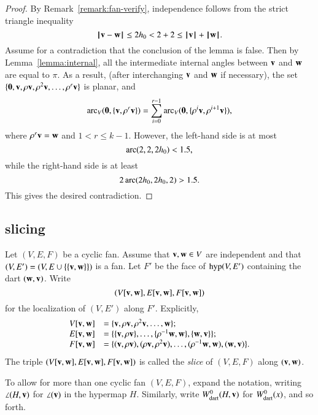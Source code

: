 \begin{proof} By Remark~\ref{remark:fan-verify}, independence follows from the strict triangle inequality
$$
\norm{\v}{\w} \le 2\hm < 2 + 2 \le \normo{\v} + \normo{\w}.
$$
Assume for a contradiction that the conclusion of the lemma is false.  Then by Lemma~\ref{lemma:internal}, all the intermediate internal angles between $\v$ and $\w$ are equal to $\pi$.  As a result, (after interchanging $\v$ and $\w$ if necessary), the set $\{\orz,\v,\rho\v,\rho^2\v,\ldots,\rho^r\v\}$ is planar, and
$$
\arc_V(\orz,\{\v,\rho^r\v\}) = \sum_{i=0}^{r-1} \arc_V(\orz,\{\rho^i\v,\rho^{i+1}\v\}),
$$
where $\rho^r \v = \w$ and $1 < r \le k-1$.
However, the left-hand side is at most
$$
\arc(2,2,2\hm) < 1.5,
$$
while the right-hand side is at least
$$
2\arc(2\hm,2\hm,2) > 1.5.
$$
This gives the desired contradiction.
\end{proof}

\subsection{slicing}

\begin{definition}[slice] Let $(V,E,F)$ be a cyclic fan.  Assume that $\v,\w\in V$ are
independent  and that
$(V,E')=(V,E\cup \{\{\v,\w\}\})$ is a fan.  Let $F'$ be the face of $\op{hyp}(V,E')$ 
containing the dart $(\w,\v)$.  Write
$$(V[\v,\w],E[\v,\w],F[\v,\w])$$
for the localization of $(V,E')$ along $F'$.  Explicitly,
$$
\begin{array}{lll}
V[\v,\w] &= \{\v,\rho \v,\rho^2 \v,\ldots,\w\};\\
E[\v,\w] &= \{\{\v,\rho \v\},\ldots,\{\rho^{-1}\w,\w\},\{\w,\v\}\};\\
F[\v,\w] &= \{(\v,\rho \v),(\rho \v,\rho^2 \v),\ldots,(\rho^{-1}\w,\w),(\w,\v)\}.
\end{array}
$$
The triple $(V[\v,\w],E[\v,\w],F[\v,\w])$ is called the {\it slice\/} of $(V,E,F)$ along
$(\v,\w)$.
\end{definition}
%

To allow for more than one cyclic fan $(V,E,F)$,  expand the notation, writing $\angle(H,\v)$ for $\angle(\v)$ in the hypermap $H$.  Similarly, write $\Wdart(H,\v)$ for $\Wdart(x)$, and so forth.
%
%


